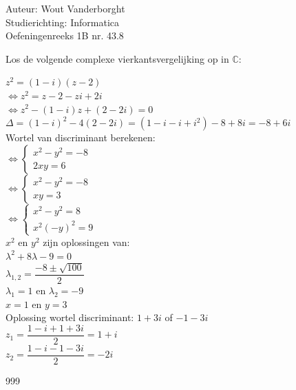 \documentclass[a4paper]{article}
\begin{document}
  
\noindent \large Auteur: Wout Vanderborght\\
\noindent \large Studierichting: Informatica\\
\noindent \large Oefeningenreeks 1B nr. 43.8\\

\medskip

\normalsize
Los de volgende complexe vierkantsvergelijking op in $ \mathbb{C} $:

$ z^2 = (1-i)(z-2) $\\

$ \Leftrightarrow z^2 = z - 2 -zi + 2i $\\

$ \Leftrightarrow z^2 - (1-i)z + (2-2i) = 0 $\\

$ \Delta = (1-i)^2 - 4(2-2i) = (1 -i -i +i^2) -8 +8i = -8 + 6i $\\

Wortel van discriminant berekenen:\\


$\Leftrightarrow \left \{
\begin{array}{l}
    x^2 - y^2 = -8 \\
    2xy = 6
\end{array}
\right .$\\

$\Leftrightarrow \left \{
\begin{array}{l}
    x^2 - y^2 = -8 \\
    xy = 3
\end{array}
\right .$\\

$\Leftrightarrow \left \{
\begin{array}{l}
    x^2 - y^2 = 8 \\
    x^2(-y)^2 = 9
\end{array}
\right .$\\

$x^2$ en $y^2$ zijn oplossingen van:\\

$ \lambda^2 + 8\lambda -9 = 0 $\\

$ \lambda_{1,2} = \dfrac{-8 \pm \sqrt{100}}{2} $\\

$ \lambda_1 = 1 $ en $ \lambda_2 = -9 $\\

$ x = 1 $ en $ y = 3 $\\

Oplossing wortel discriminant: $ 1 + 3i $ of $ -1 - 3i $\\

$ z_1 = \dfrac{1-i + 1 + 3i}{2} = 1 + i $\\

$ z_2 = \dfrac{1-i - 1 - 3i}{2} = -2i $

\begin{thebibliography}{999}
\end{thebibliography}
\end{document}
